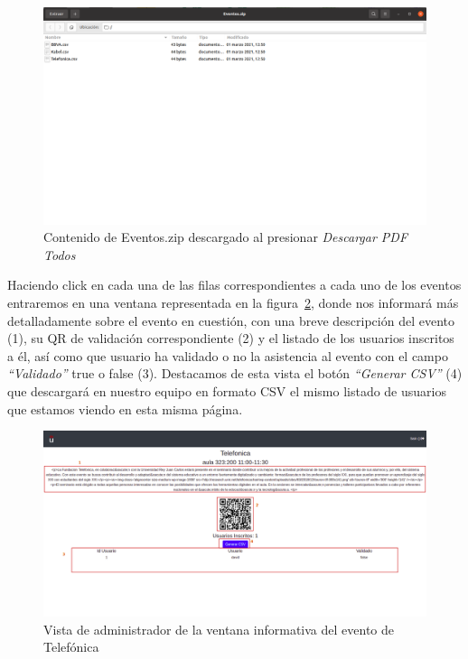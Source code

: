 \documentclass[a4paper, 12pt]{book}
\begin{document}
\begin{enumerate}
	\begin{figure}
  	\centering
  	\includegraphics[width=16cm, keepaspectratio]{img/AdminEventosZip.png}
  	\caption{Contenido de Eventos.zip descargado al presionar \textit{Descargar PDF Todos}}\label{fig:AdminEventosZip}
	\end{figure}
	
	 
	Haciendo click en cada una de las filas correspondientes a cada uno de los eventos entraremos en una ventana representada en la figura~\ref{fig:adminListaEventoTelefonica}, donde nos informará más detalladamente sobre el evento en cuestión, con una breve descripción del evento (1), su QR de validación correspondiente (2) y el listado de los usuarios inscritos a él, así como que usuario ha validado o no la asistencia al evento con el campo \textit{``Validado''} true o false (3). Destacamos de esta vista el botón \textit{``Generar CSV''} (4) que descargará en nuestro equipo en formato CSV el mismo listado de usuarios que estamos viendo en esta misma página.
	
	\begin{figure}
  	\centering
  	\includegraphics[width=16cm, keepaspectratio]{img/adminListaEventoTelefonica.png}
  	\caption{Vista de administrador de la ventana informativa del evento de Telefónica}\label{fig:adminListaEventoTelefonica}
	\end{figure}



\end{enumerate}
\end{document}
